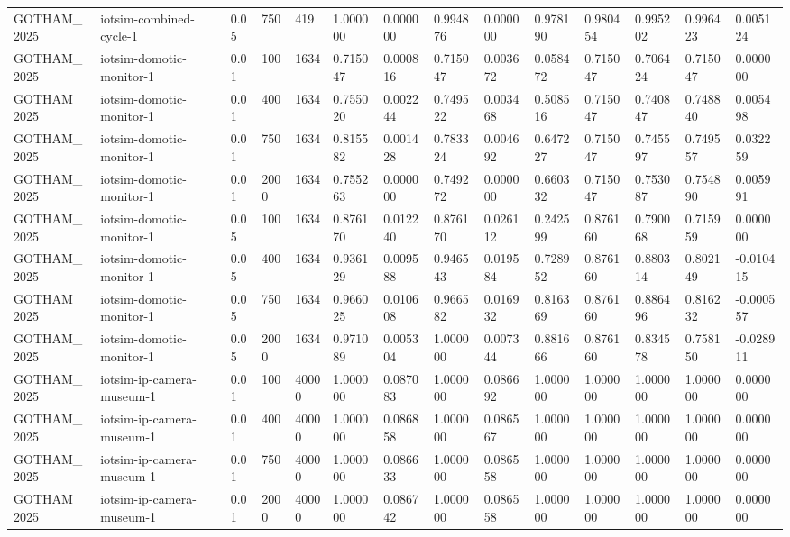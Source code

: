 \begin{tabular}{llllllllllllll}
GOTHAM\_2025 & iotsim-combined-cycle-1 & 0.05 & 750 & 419 & 1.000000 & 0.000000 & 0.994876 & 0.000000 & 0.978190 & 0.980454 & 0.995202 & 0.996423 & 0.005124 \\
GOTHAM\_2025 & iotsim-domotic-monitor-1 & 0.01 & 100 & 1634 & 0.715047 & 0.000816 & 0.715047 & 0.003672 & 0.058472 & 0.715047 & 0.706424 & 0.715047 & 0.000000 \\
GOTHAM\_2025 & iotsim-domotic-monitor-1 & 0.01 & 400 & 1634 & 0.755020 & 0.002244 & 0.749522 & 0.003468 & 0.508516 & 0.715047 & 0.740847 & 0.748840 & 0.005498 \\
GOTHAM\_2025 & iotsim-domotic-monitor-1 & 0.01 & 750 & 1634 & 0.815582 & 0.001428 & 0.783324 & 0.004692 & 0.647227 & 0.715047 & 0.745597 & 0.749557 & 0.032259 \\
GOTHAM\_2025 & iotsim-domotic-monitor-1 & 0.01 & 2000 & 1634 & 0.755263 & 0.000000 & 0.749272 & 0.000000 & 0.660332 & 0.715047 & 0.753087 & 0.754890 & 0.005991 \\
GOTHAM\_2025 & iotsim-domotic-monitor-1 & 0.05 & 100 & 1634 & 0.876170 & 0.012240 & 0.876170 & 0.026112 & 0.242599 & 0.876160 & 0.790068 & 0.715959 & 0.000000 \\
GOTHAM\_2025 & iotsim-domotic-monitor-1 & 0.05 & 400 & 1634 & 0.936129 & 0.009588 & 0.946543 & 0.019584 & 0.728952 & 0.876160 & 0.880314 & 0.802149 & -0.010415 \\
GOTHAM\_2025 & iotsim-domotic-monitor-1 & 0.05 & 750 & 1634 & 0.966025 & 0.010608 & 0.966582 & 0.016932 & 0.816369 & 0.876160 & 0.886496 & 0.816232 & -0.000557 \\
GOTHAM\_2025 & iotsim-domotic-monitor-1 & 0.05 & 2000 & 1634 & 0.971089 & 0.005304 & 1.000000 & 0.007344 & 0.881666 & 0.876160 & 0.834578 & 0.758150 & -0.028911 \\
GOTHAM\_2025 & iotsim-ip-camera-museum-1 & 0.01 & 100 & 40000 & 1.000000 & 0.087083 & 1.000000 & 0.086692 & 1.000000 & 1.000000 & 1.000000 & 1.000000 & 0.000000 \\
GOTHAM\_2025 & iotsim-ip-camera-museum-1 & 0.01 & 400 & 40000 & 1.000000 & 0.086858 & 1.000000 & 0.086567 & 1.000000 & 1.000000 & 1.000000 & 1.000000 & 0.000000 \\
GOTHAM\_2025 & iotsim-ip-camera-museum-1 & 0.01 & 750 & 40000 & 1.000000 & 0.086633 & 1.000000 & 0.086558 & 1.000000 & 1.000000 & 1.000000 & 1.000000 & 0.000000 \\
GOTHAM\_2025 & iotsim-ip-camera-museum-1 & 0.01 & 2000 & 40000 & 1.000000 & 0.086742 & 1.000000 & 0.086558 & 1.000000 & 1.000000 & 1.000000 & 1.000000 & 0.000000 \\

\end{tabular}
